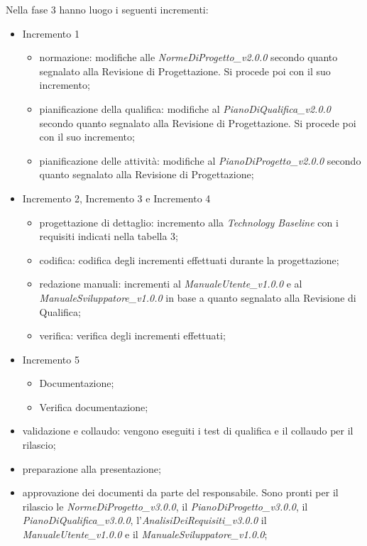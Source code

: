 Nella fase 3 hanno luogo i seguenti incrementi:
\begin{itemize}
	\item Incremento 1
	\begin{itemize}
		\item normazione: modifiche alle \textit{NormeDiProgetto\_v2.0.0} secondo quanto segnalato alla Revisione di Progettazione. Si procede poi con il suo incremento;
		\item pianificazione della qualifica: modifiche al \textit{PianoDiQualifica\_v2.0.0} secondo quanto segnalato alla Revisione di Progettazione. Si procede poi con il suo incremento;
		\item pianificazione delle attività: modifiche al \textit{PianoDiProgetto\_v2.0.0} secondo quanto segnalato alla Revisione di Progettazione;
	\end{itemize}
	\item Incremento 2, Incremento 3 e Incremento 4
	\begin{itemize}
		\item progettazione di dettaglio: incremento alla \textit{Technology Baseline} con i requisiti indicati nella tabella 3;
		\item codifica: codifica degli incrementi effettuati durante la progettazione;
		\item redazione manuali: incrementi al \textit{ManualeUtente\_v1.0.0} e al \textit{ManualeSviluppatore\_v1.0.0} in base a quanto segnalato alla Revisione di Qualifica;
		\item verifica: verifica degli incrementi effettuati;
	\end{itemize}
	\item Incremento 5
	\begin{itemize}
		\item Documentazione;
		\item Verifica documentazione;
	\end{itemize}
	\item validazione e collaudo: vengono eseguiti i test di qualifica e il collaudo per il rilascio;
	\item preparazione alla presentazione;
	\item approvazione dei documenti da parte del responsabile. Sono pronti per il rilascio le \textit{NormeDiProgetto\_v3.0.0}, il \textit{PianoDiProgetto\_v3.0.0}, il \textit{PianoDiQualifica\_v3.0.0}, l'\textit{AnalisiDeiRequisiti\_v3.0.0} il
	\textit{ManualeUtente\_v1.0.0} e il \textit{ManualeSviluppatore\_v1.0.0};
\end{itemize}

